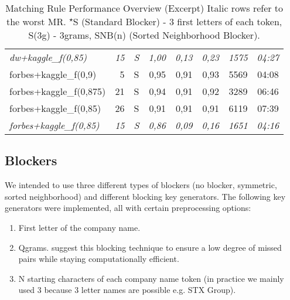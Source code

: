 \documentclass[11pt,titlepage,oneside,openany]{article}
\begin{document}
\begin{table}[]
\begin{tabular}{lrcrrrrc}
		\textit{dw+kaggle\_f(0,85) }              & \textit{15}                   & \textit{S}         & \textit{1,00 }                 & \textit{0,13 }                 & \textit{0,23   }                & \textit{1575}                       & \textit{04:27}          \\\hdashline
		forbes+kaggle\_f(0,9)            & 5                      & S          & 0,95                  & 0,91                  & 0,93                   & 5569                       & 04:08          \\
		forbes+kaggle\_f(0,875)          & 21                     & S          & 0,94                  & 0,91                  & 0,92                   & 3289                       & 06:46          \\
		forbes+kaggle\_f(0,85)  & 26          & S & 0,91         & 0,91         & 0,91          & 6119              & 07:39 \\
		\textit{forbes+kaggle\_f(0,85)  }         & \textit{15}                     & \textit{S}          & \textit{0,86}                  &\textit{0,09}                 &\textit{0,16}                   & \textit{1651}                       & \textit{04:16}       
	\end{tabular}
\caption[Matching Rule Performance Overview (Excerpt)]{Matching Rule Performance Overview (Excerpt) \medspace\small Italic rows refer to the worst MR. \textsuperscript{$\star$}S (Standard Blocker) - 3 first letters of each token, S(3g) - 3grams, SNB(n) (Sorted Neighborhood Blocker).}
\label{tab:mr-performance}

\end{table}



\subsection{Blockers}
\label{sec:blockers}

We intended to use three different types of blockers (no blocker, symmetric, sorted neighborhood) and different blocking key generators. The following key generators were implemented, all with certain preprocessing options: \begin{enumerate}
	\item First letter of the company name.
	\item Qgrams. \cite{gravano_approximate_nodate} suggest this blocking technique to ensure a low degree of missed pairs while staying computationally efficient.
	\item N starting characters of each company name token (in practice we mainly used 3 because 3 letter names are possible e.g. STX Group).
\end{enumerate}
\end{document}
